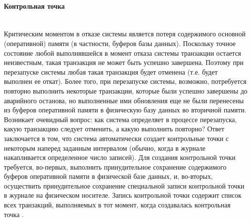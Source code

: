 \paragraph{Контрольная точка} ~\\
Критическим моментом в отказе системы является потеря содержимого основной
(оперативной) памяти (в частности, буферов базы данных). Поскольку точное состояние
любой выполнявшейся в момент отказа системы транзакции остается неизвестным, такая транзакция не может быть успешно завершена. Поэтому при перезапуске системы
любая такая транзакция будет отменена (т.е. будет выполнен ее откат).
Более того, при перезапуске системы, возможно, потребуется повторно выполнить некоторые транзакции, которые были успешно завершены
до аварийного останова, но выполненные ими обновления еще не были перенесены из
буферов оперативной памяти в физическую базу данных во вторичной памяти.
Возникает очевидный вопрос: как система определяет в процессе перезапуска, какую
транзакцию следует отменить, а какую выполнить повторно? Ответ заключается в том,
что система автоматически создает контрольные точки с некоторым наперед заданным
интервалом (обычно, когда в журнале накапливается определенное число записей). Для
создания контрольной точки требуется, во-первых, выполнить принудительное сохранение содержимого буферов оперативной памяти в физической базе данных, и, во-вторых,
осуществить принудительное сохранение специальной записи контрольной точки в журнале на физическом носителе. Запись контрольной точки содержит список всех транзакций, выполняемых в тот момент, когда создавалась контрольная точка \autocite{Date2005}.

